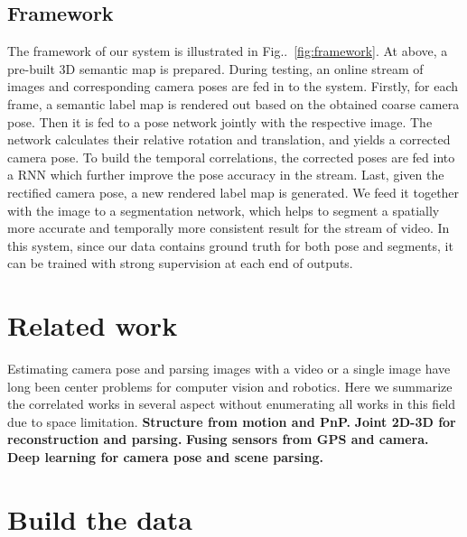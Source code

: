 \documentclass[10pt,twocolumn,letterpaper]{article}
\makeatletter
\newcommand{\figref}[1]{Fig\onedot~\ref{#1}}
\DeclareRobustCommand\onedot{\futurelet\@let@token\@onedot}
\def\onedot{\ifx\@let@token.\else.\null\fi\xspace}
\makeatother
\begin{document}
\subsection{Framework}
\label{sub:framework}
The framework of our system is illustrated in \figref{fig:framework}. At above, a pre-built 3D semantic map is prepared. During testing, an online stream of images and corresponding camera poses are fed in to the system. Firstly, for each frame, a semantic label map is rendered out based on the obtained coarse camera pose. Then it is fed to a pose network jointly with the respective image.  The network calculates their relative rotation and translation, and yields a corrected camera pose. To build the temporal correlations, the corrected poses are fed into a RNN which further improve the pose accuracy in the stream. 
Last, given the rectified camera pose, a new rendered label map is generated. We feed it together with the image to a segmentation network, which helps to segment a spatially more accurate and temporally more consistent result for the stream of video. 
In this system, since our data contains ground truth for both pose and segments, it can be trained with strong supervision at each end of outputs.

\section{Related work}
\label{sec:related_work}
Estimating camera pose and parsing images with a video or a single image have long been center problems for computer vision and robotics. 
Here we summarize the correlated works in several aspect without enumerating all works in this field due to space limitation.
\textbf{Structure from motion and PnP.}
\textbf{Joint 2D-3D for reconstruction and parsing.}
\textbf{Fusing sensors from GPS and camera.}
\textbf{Deep learning for camera pose and scene parsing.}


\section{Build the data}
\label{sec:data_collection}
\end{document}
